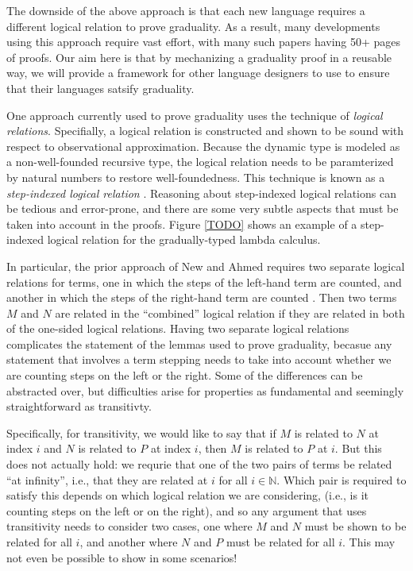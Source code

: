 \documentclass[acmsmall,screen]{acmart}
\begin{document}
  The downside of the above approach is that each new language requires a different logical relation
  to prove graduality. As a result, many developments using this approach require vast effort,
  with many such papers having 50+ pages of proofs.
  Our aim here is that by mechanizing a graduality proof in a reusable way,
  we will provide a framework for other language designers to use to ensure that their languages satsify graduality.


  One approach currently used to prove graduality uses the technique of \emph{logical relations}.
  Specifially, a logical relation is constructed and shown to be sound with respect to
  observational approximation. Because the dynamic type is modeled as a non-well-founded
  recursive type, the logical relation needs to be paramterized by natural numbers to restore well-foundedness.
  This technique is known as a \emph{step-indexed logical relation} \cite{TODO}.
  Reasoning about step-indexed logical relations
  can be tedious and error-prone, and there are some very subtle aspects that must
  be taken into account in the proofs. Figure \ref{TODO} shows an example of a step-indexed logical
  relation for the gradually-typed lambda calculus.

  In particular, the prior approach of New and Ahmed requires two separate logical
  relations for terms, one in which the steps of the left-hand term are counted,
  and another in which the steps of the right-hand term are counted \cite{TODO}.
  Then two terms $M$ and $N$ are related in the ``combined'' logical relation if they are
  related in both of the one-sided logical relations. Having two separate logical relations
  complicates the statement of the lemmas used to prove graduality, becasue any statement that
  involves a term stepping needs to take into account whether we are counting steps on the left
  or the right. Some of the differences can be abstracted over, but difficulties arise for properties %
  as fundamental and seemingly straightforward as transitivty.

  Specifically, for transitivity, we would like to say that if $M$ is related to $N$ at
  index $i$ and $N$ is related to $P$ at index $i$, then $M$ is related to $P$ at $i$.
  But this does not actually hold: we requrie that one of the two pairs of terms
  be related ``at infinity'', i.e., that they are related at $i$ for all $i \in \mathbb{N}$.
  Which pair is required to satisfy this depends on which logical relation we are considering,
  (i.e., is it counting steps on the left or on the right),
  and so any argument that uses transitivity needs to consider two cases, one
  where $M$ and $N$ must be shown to be related for all $i$, and another where $N$ and $P$ must
  be related for all $i$. This may not even be possible to show in some scenarios!
\end{document}
